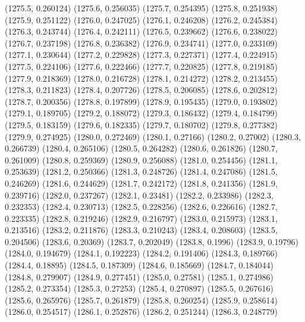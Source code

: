 {					(1275.5, 0.260124)
					(1275.6, 0.256035)
					(1275.7, 0.254395)
					(1275.8, 0.251938)
					(1275.9, 0.251122)
					(1276.0, 0.247025)
					(1276.1, 0.246208)
					(1276.2, 0.245384)
					(1276.3, 0.243744)
					(1276.4, 0.242111)
					(1276.5, 0.239662)
					(1276.6, 0.238022)
					(1276.7, 0.237198)
					(1276.8, 0.236382)
					(1276.9, 0.234741)
					(1277.0, 0.233109)
					(1277.1, 0.230644)
					(1277.2, 0.229828)
					(1277.3, 0.227371)
					(1277.4, 0.224915)
					(1277.5, 0.224106)
					(1277.6, 0.222466)
					(1277.7, 0.220825)
					(1277.8, 0.219185)
					(1277.9, 0.218369)
					(1278.0, 0.216728)
					(1278.1, 0.214272)
					(1278.2, 0.213455)
					(1278.3, 0.211823)
					(1278.4, 0.207726)
					(1278.5, 0.206085)
					(1278.6, 0.202812)
					(1278.7, 0.200356)
					(1278.8, 0.197899)
					(1278.9, 0.195435)
					(1279.0, 0.193802)
					(1279.1, 0.189705)
					(1279.2, 0.188072)
					(1279.3, 0.186432)
					(1279.4, 0.184799)
					(1279.5, 0.183159)
					(1279.6, 0.182335)
					(1279.7, 0.180702)
					(1279.8, 0.277382)
					(1279.9, 0.274925)
					(1280.0, 0.272469)
					(1280.1, 0.27166)
					(1280.2, 0.27002)
					(1280.3, 0.266739)
					(1280.4, 0.265106)
					(1280.5, 0.264282)
					(1280.6, 0.261826)
					(1280.7, 0.261009)
					(1280.8, 0.259369)
					(1280.9, 0.256088)
					(1281.0, 0.254456)
					(1281.1, 0.253639)
					(1281.2, 0.250366)
					(1281.3, 0.248726)
					(1281.4, 0.247086)
					(1281.5, 0.246269)
					(1281.6, 0.244629)
					(1281.7, 0.242172)
					(1281.8, 0.241356)
					(1281.9, 0.239716)
					(1282.0, 0.237267)
					(1282.1, 0.23481)
					(1282.2, 0.233986)
					(1282.3, 0.232353)
					(1282.4, 0.230713)
					(1282.5, 0.228256)
					(1282.6, 0.226616)
					(1282.7, 0.223335)
					(1282.8, 0.219246)
					(1282.9, 0.216797)
					(1283.0, 0.215973)
					(1283.1, 0.213516)
					(1283.2, 0.211876)
					(1283.3, 0.210243)
					(1283.4, 0.208603)
					(1283.5, 0.204506)
					(1283.6, 0.20369)
					(1283.7, 0.202049)
					(1283.8, 0.1996)
					(1283.9, 0.19796)
					(1284.0, 0.194679)
					(1284.1, 0.192223)
					(1284.2, 0.191406)
					(1284.3, 0.189766)
					(1284.4, 0.18895)
					(1284.5, 0.187309)
					(1284.6, 0.185669)
					(1284.7, 0.184044)
					(1284.8, 0.279907)
					(1284.9, 0.277451)
					(1285.0, 0.27581)
					(1285.1, 0.274986)
					(1285.2, 0.273354)
					(1285.3, 0.27253)
					(1285.4, 0.270897)
					(1285.5, 0.267616)
					(1285.6, 0.265976)
					(1285.7, 0.261879)
					(1285.8, 0.260254)
					(1285.9, 0.258614)
					(1286.0, 0.254517)
					(1286.1, 0.252876)
					(1286.2, 0.251244)
					(1286.3, 0.248779)
}
